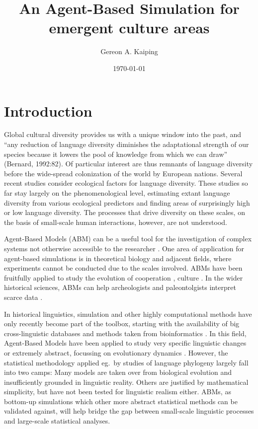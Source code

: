 \documentclass[a4paper,12pt]{scrartcl}
\title{An Agent-Based Simulation for emergent culture areas}
\date{\today}
\author[1,2]{Gereon A. Kaiping}
\affil[1]{Geographic Information Science Center, Universität Zürich, CH}
\affil[2]{NCCR Evolving Language}
\begin{document}
\maketitle
\section{Introduction}
Global cultural diversity provides us with a unique window into the past, and
“any reduction of language diversity diminishes the adaptational strength of our
species because it lowers the pool of knowledge from which we can draw”
(Bernard, 1992:82). %
Of particular interest are thus remnants of language diversity before the
wide-spread colonization of the world by European nations. Several recent
studies
\parencite{gavin2017processbased,pachecocoelho2019drivers,hua2019ecological}
consider ecological factors for language diversity. These studies so far stay
largely on the phenomenological level, estimating extant language diversity from
various ecological predictors and finding areas of surprisingly high or low
language diversity. The processes that drive diversity on these scales, on the
basis of small-scale human interactions, however, are not understood.

Agent-Based Models (ABM) \parencite{} can be a useful tool for the investigation
of complex systems not otherwise accessible to the researcher \parencite{}. One
area of application for agent-based simulations is in theoretical biology and
adjacent fields, where experiments cannot be conducted due to the scales
involved. ABMs have been fruitfully applied to study the evolution of
cooperation \parencite{}, culture \parencite{}. In the wider historical
sciences, ABMs can help archeologists and paleontolgists interpret scarce data
\parencite{cegielski2016rethinking,barcelo2016simulating}.

In historical linguistics, simulation and other highly computational methods
have only recently become part of the toolbox, starting with the availability of big
cross-linguistic databases and methods taken from bioinformatics
\parencite{}. In this field, Agent-Based Models have been applied to study very
specific linguistic changes
\cite{bloem2015agentbased,feltgen2017modeling,grim2011simulating,radulescu2016modelling,vantrijp2016evolution}
or extremely abstract, focussing on evolutionary dynamics
\cite{arita1998evolution,castello2013agentbased,javarone2014competitive}.
However, the statistical methodology applied eg.\ by studies of language
phylogeny largely fall into two camps: Many models are taken over from
biological evolution and insufficiently grounded in linguistic reality. Others
are justified by mathematical simplicity, but have not been tested for
linguistic realism either. ABMs, as bottom-up simulations which other more
abstract statistical methods can be validated against, will help bridge the gap
between small-scale linguistic processes and large-scale statistical analyses.
\end{document}
